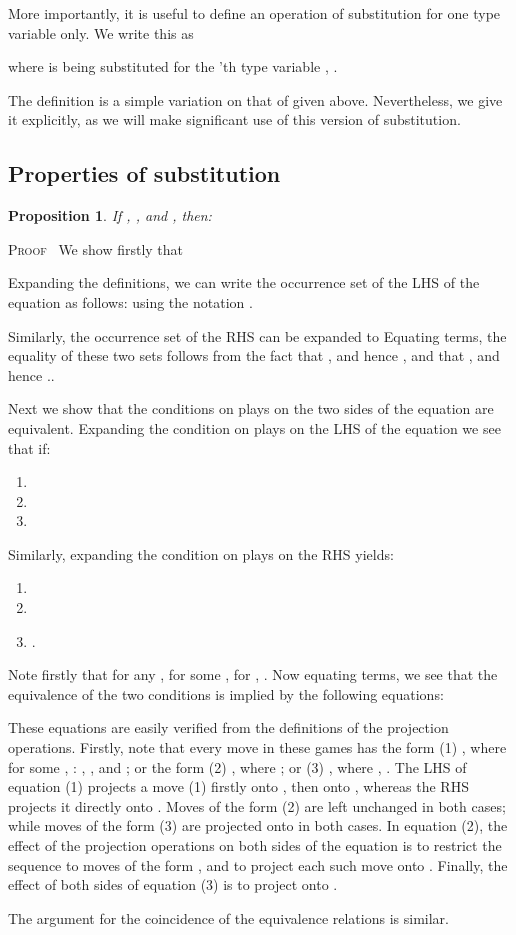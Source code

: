 \documentclass[a4paper,11pt]{article}
\newtheorem{proposition}{Proposition}[section]
\newenvironment{proof}{\textsc{Proof}\ }{}
\begin{document}
More importantly, it is useful to define an operation of substitution
for one type variable only. We write this as

where  is being substituted for the 'th type variable , .

The definition is a simple variation on that of  given
  above. Nevertheless, we give it explicitly, as we will make
  significant use of this version of substitution.






\subsection{Properties of substitution}


\begin{proposition}
\label{sub00}
If , , and , then:

\end{proposition}
\begin{proof}
We show firstly that

Expanding the definitions, we can write the occurrence set of the LHS
of the equation as follows:
 using the
notation .

Similarly, the occurrence set of the RHS can be expanded to
 Equating terms, the equality of these two sets follows from the
fact that , and hence ,
and that , and hence ..

Next we show that the conditions on plays on the two sides of the
equation are equivalent. Expanding the condition on plays on the LHS of the equation we see that  if:
\begin{enumerate}
\item 
\item 
\item 
\end{enumerate}
Similarly, expanding the condition on plays on the RHS yields:
\begin{enumerate}
\item 
\item 
\item .
\end{enumerate}
Note firstly that for any , for some ,  for , .
Now equating terms, we see that the equivalence of the two conditions is implied by the following equations:

These equations are easily verified from the definitions of the
projection operations. Firstly, note that every move in these
games has the form (1) , where for some , : , , and ; or the
form (2) , where ; or (3) , where , . The LHS
of equation (1) projects  a move (1) firstly onto , then
onto , whereas the RHS projects it directly onto . Moves of
the form (2) are left unchanged in both cases; while moves of the
form (3) are projected onto  in both cases.
In
equation (2), the effect of  the projection operations on both sides
of the equation is to
restrict the sequence to moves of the form , and to
project each such move onto . Finally, the effect of both sides
of equation (3) is to project  onto .

The argument for the coincidence of the equivalence relations is
similar.
\end{proof}
\end{document}

